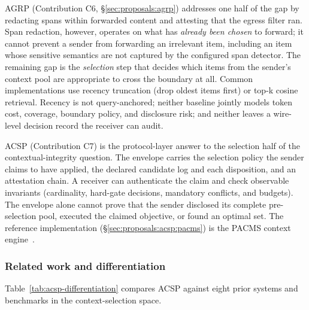 AGRP (Contribution C6, \S\ref{sec:proposals:agrp})
addresses one half of the gap by redacting spans within
forwarded content and attesting that the egress filter
ran. Span redaction, however, operates on what has
\emph{already been chosen} to forward; it cannot prevent
a sender from forwarding an irrelevant item, including an
item whose sensitive semantics are not captured by the
configured span detector. The remaining gap is the
\emph{selection} step that decides which items from the
sender's context pool are appropriate to cross the
boundary at all. Common implementations use recency
truncation (drop oldest items first) or top-k cosine
retrieval. Recency is not query-anchored; neither baseline
jointly models token cost, coverage, boundary policy, and
disclosure risk; and neither leaves a wire-level decision
record the receiver can audit.

ACSP (Contribution C7) is the protocol-layer answer to
the selection half of the contextual-integrity question.
The envelope carries the selection policy the sender
claims to have applied, the declared candidate log and
each disposition, and an attestation chain. A receiver can
authenticate the claim and check observable invariants
(cardinality, hard-gate decisions, mandatory conflicts,
and budgets). The envelope alone cannot prove that the
sender disclosed its complete pre-selection pool, executed
the claimed objective, or found an optimal set. The
reference implementation
(\S\ref{sec:proposals:acsp:pacms}) is the PACMS context
engine~\cite{pacms_cikm_demo}.

\subsubsection{Related work and differentiation}
\label{sec:proposals:acsp:related}

Table~\ref{tab:acsp-differentiation} compares ACSP
against eight prior systems and benchmarks in the
context-selection space.

